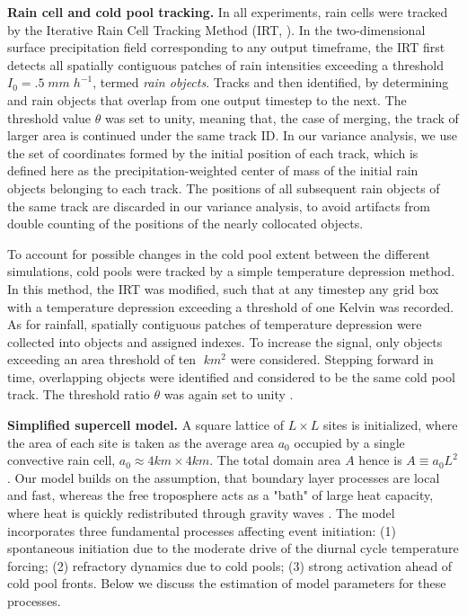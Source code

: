 \documentclass[draft,linenumbers]{agujournal2019}
\begin{document}
\noindent
{\bf Rain cell and cold pool tracking.}
In all experiments, rain cells were tracked by the Iterative Rain Cell Tracking Method (IRT, \cite{moseley2019statistical}).
In the two-dimensional surface precipitation field corresponding to any output timeframe, the IRT first detects all spatially contiguous patches of rain intensities exceeding a threshold $I_0=.5\;mm\;h^{-1}$, termed {\it rain objects}.
Tracks and then identified, by determining and rain objects that overlap from one output timestep to the next. 
The threshold value $\theta$ was set to unity, meaning that, the case of merging, the track of larger area is continued under the same track ID.
In our variance analysis, we use the set of coordinates formed by the initial position of each track, which is defined here as the precipitation-weighted center of mass of the initial rain objects belonging to each track.
The positions of all subsequent rain objects of the same track are discarded in our variance analysis, to avoid artifacts from double counting of the positions of the nearly collocated objects.

To account for possible changes in the cold pool extent between the different simulations, cold pools were tracked by a simple temperature depression method.
In this method, the IRT was modified, such that at any timestep any grid box with a temperature depression exceeding a threshold of one Kelvin was recorded.
As for rainfall, spatially contiguous patches of temperature depression were collected into objects and assigned indexes.
To increase the signal, only objects exceeding an area threshold of ten $\;km^2$ were considered.
Stepping forward in time, overlapping objects were identified and considered to be the same cold pool track.
The threshold ratio $\theta$ was again set to unity \cite{moseley2019statistical}.

\noindent
{\bf Simplified supercell model.}
A square lattice of $L\times L$ sites is initialized, where the area of each site is taken as the average area $a_0$ occupied by a single convective rain cell, $a_0\approx 4km\times 4km$. 
The total domain area $A$ hence is $A\equiv a_0L^2$.
Our model builds on the assumption, that boundary layer processes are local and fast, whereas the free troposphere acts as a "bath" of large heat capacity, where heat is quickly redistributed through gravity waves \cite{bretherton1989gravity}. 
The model incorporates three fundamental processes affecting event initiation: 
(1) spontaneous initiation due to the moderate drive of the diurnal cycle temperature forcing;
(2) refractory dynamics due to cold pools; 
(3) strong activation ahead of cold pool fronts.
Below we discuss the estimation of model parameters for these processes.
\end{document}
